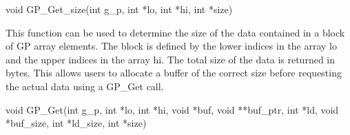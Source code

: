 \documentclass[12pt]{article}
\begin{document}


\begin{capi}
\begin{ccode}
void GP\_Get\_size(int g\_p, int *lo, int *hi, int *size)
\begin{funcargs}
\end{funcargs}
\end{ccode}
\end{capi}

\local

\begin{desc}

This function can be used to determine the size of the data contained in a block
of GP array elements. The block is defined by the lower indices in the array lo
and the upper indices in the array hi. The total size of the data is returned in
bytes. This allows users to allocate a buffer of the correct size before
requesting the actual data using a GP\_Get call.

\end{desc}



\begin{capi}
\begin{ccode}
void GP\_Get(int g\_p, int *lo, int *hi, void *buf, void **buf\_ptr, int *ld,
             void *buf\_size, int *ld\_size, int *size)
\begin{funcargs}
\end{funcargs}
\end{ccode}
\end{capi}

\local
\end{document}
